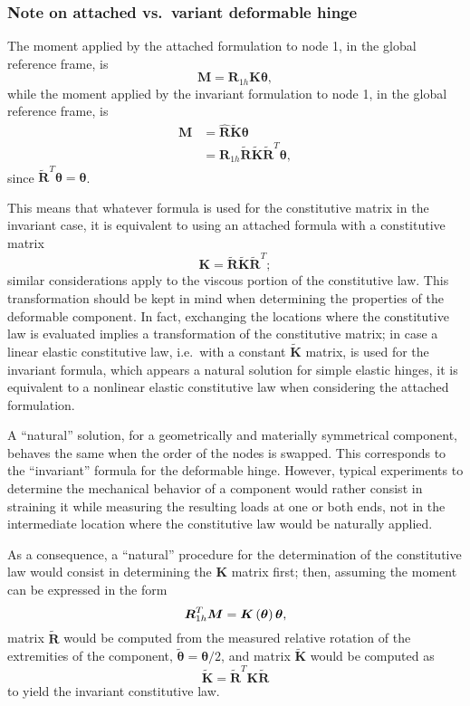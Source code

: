 \documentclass[10pt,dvips,fleqn]{report}
\newcommand{\T}[1]{\boldsymbol{#1}}
\begin{document}
\subsubsection{Note on attached vs.\ variant deformable hinge}
The moment applied by the attached formulation to node 1,
in the global reference frame, is
\begin{equation}
	\T{M} = \T{R}_{1h} \T{K} \T{\theta} ,
\end{equation}
while the moment applied by the invariant formulation to node 1,
in the global reference frame, is
\begin{align}
	\T{M} &= \hat{\T{R}} \tilde{\T{K}} \T{\theta} \\
	&= \T{R}_{1h} \tilde{\T{R}} \tilde{\T{K}} \tilde{\T{R}}^T \T{\theta} ,
\end{align}
since $\tilde{\T{R}}^T \T{\theta}=\T{\theta}$.

This means that whatever formula is used for the constitutive matrix
in the invariant case, it is equivalent to using an attached formula 
with a constitutive matrix
\begin{equation}
	\T{K} = \tilde{\T{R}} \tilde{\T{K}} \tilde{\T{R}}^T ;
\end{equation}
similar considerations apply to the viscous portion of the constitutive law.
This transformation should be kept in mind when determining the properties
of the deformable component.
In fact, exchanging the locations where the constitutive law is evaluated
implies a transformation of the constitutive matrix; in case a linear elastic
constitutive law, i.e.\ with a constant $\tilde{\T{K}}$ matrix, is used
for the invariant formula, which appears a natural solution for simple 
elastic hinges, it is equivalent to a nonlinear elastic constitutive
law when considering the attached formulation.

A ``natural'' solution, for a geometrically and materially symmetrical
component, behaves the same when the order of the nodes is swapped.
This corresponds to the ``invariant'' formula for the deformable hinge.
However, typical experiments to determine the mechanical behavior
of a component would rather consist in straining it while measuring
the resulting loads at one or both ends, not in the intermediate
location where the constitutive law would be naturally applied.

As a consequence, a ``natural'' procedure for the determination
of the constitutive law would consist in determining the $\T{K}$
matrix first; then, assuming the moment can be expressed in the form
\begin{equation}
	\T{R}_{1h}^T \T{M} = \T{K}\plbr{\T{\theta}} \T{\theta} ,
\end{equation}
matrix $\tilde{\T{R}}$ would be computed
from the measured relative rotation of the extremities of the component,
$\tilde{\T{\theta}}=\T{\theta}/2$,
and matrix $\tilde{\T{K}}$ would be computed as
\begin{equation}
	\tilde{\T{K}} = \tilde{\T{R}}^T \T{K} \tilde{\T{R}}
\end{equation}
to yield the invariant constitutive law.
\end{document}
